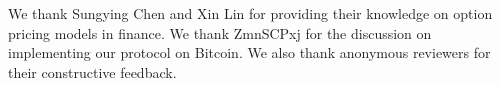 \documentclass[sigconf, natbib=false]{acmart}
\renewcommand\_{\textunderscore\allowbreak}
\begin{document}












\begin{acks}
We thank Sungying Chen and Xin Lin for providing their knowledge on option pricing models in finance.
We thank ZmnSCPxj for the discussion on implementing our protocol on Bitcoin.
We also thank anonymous reviewers for their constructive feedback.
\end{acks}

\printbibliography


\end{document}
